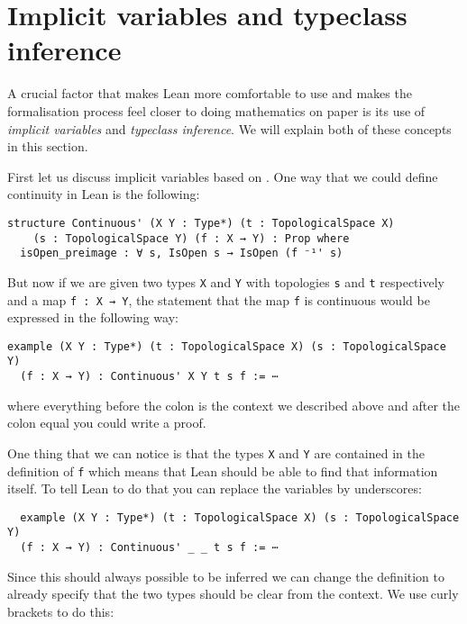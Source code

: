 \section{Implicit variables and typeclass inference}

A crucial factor that makes Lean more comfortable to use and makes the formalisation process feel closer to doing mathematics on paper is its use of \emph{implicit variables} and \emph{typeclass inference}. 
We will explain both of these concepts in this section.

First let us discuss implicit variables based on \cite{Avigad2024}. 
One way that we could define continuity in Lean is the following: 

\begin{lstlisting}
structure Continuous' (X Y : Type*) (t : TopologicalSpace X) 
    (s : TopologicalSpace Y) (f : X → Y) : Prop where
  isOpen_preimage : ∀ s, IsOpen s → IsOpen (f ⁻¹' s)
\end{lstlisting}

But now if we are given two types \lstinline{X} and \lstinline{Y} with topologies \lstinline{s} and \lstinline{t} respectively and a map \lstinline{f : X → Y}, the statement that the map \lstinline{f} is continuous would be expressed in the following way:

\begin{lstlisting}
example (X Y : Type*) (t : TopologicalSpace X) (s : TopologicalSpace Y) 
  (f : X → Y) : Continuous' X Y t s f := ⋯
\end{lstlisting}

where everything before the colon is the context we described above and after the colon equal you could write a proof.

One thing that we can notice is that the types \lstinline{X} and \lstinline{Y} are contained in the definition of \lstinline{f} which means that Lean should be able to find that information itself. 
To tell Lean to do that you can replace the variables by underscores: 

\begin{lstlisting}
  example (X Y : Type*) (t : TopologicalSpace X) (s : TopologicalSpace Y) 
  (f : X → Y) : Continuous' _ _ t s f := ⋯
\end{lstlisting}

Since this should always possible to be inferred we can change the definition to already specify that the two types should be clear from the context. 
We use curly brackets to do this: 

